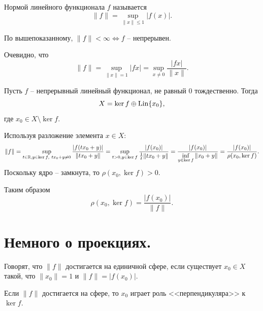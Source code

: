 \begin{definition}
    Нормой линейного функционала $f$ называется
    \[
        \|f\| = \sup_{\|x\| \leq 1} |f(x)|.
    \]

    По вышепоказанному, $\|f\| < \infty \Longleftrightarrow f$ -- непрерывен.

    Очевидно, что
    \[
        \|f\| = \sup_{\|x\| = 1} |fx| = \sup_{x \neq 0} \frac{|fx|}{\|x\|}.
    \]
\end{definition}
\begin{example}
    Пусть $f$ -- непрерывный линейный функционал, не равный $0$ тождественно.
    Тогда
    \[
        X = \ker f \oplus \operatorname{Lin}\{x_0\},
    \]
    где $x_0 \in X \setminus \ker f$.

    Используя разложение элемента $x \in X\colon$
    \[
        \|f\| = \sup_{t \in \mathbb{R}, y \in \ker f, \ t x_0 + y \neq 0} \frac{|f(tx_0 + y)|}{\|tx_0 + y\|} = \sup_{t > 0, y \in \ker f} \frac{|f(x_0)|}{\frac{1}{t}\|t x_0 + y\|} = \frac{|f(x_0)|}{\inf\limits_{y \in \ker f} \|x_0 + y\|} = \frac{|f(x_0)|}{\rho(x_0, \ker f)}.
    \]
    Поскольку ядро -- замкнута, то $\rho(x_0, \ker f) > 0$.

    Таким образом
    \[
        \rho(x_0, \ker f) = \frac{|f(x_0)|}{\|f\|}.
    \]
\end{example}
\section{Немного о проекциях.}
\begin{definition}
    Говорят, что $\|f\|$ достигается на единичной сфере, если существует $x_0 \in X$ такой, что $\|x_0\| = 1$ и $\|f\| = |f(x_0)|$.
\end{definition}

\begin{note}
    Если $\|f\|$ достигается на сфере, то $x_0$ играет роль <<перпендикуляра>> к $\ker f$.
\end{note}

